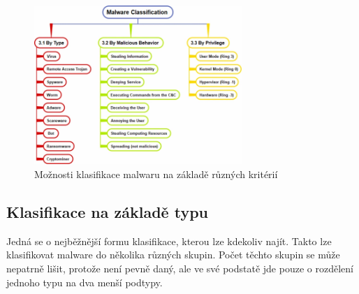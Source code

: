 \begin{figure}[h]
	\centering
        \includegraphics[width=0.7\textwidth]{obrazky/classification.png}
	\caption{Možnosti klasifikace malwaru na základě různých kritérií}
    \label{classific}
\end{figure}
\newpage
\subsection*{Klasifikace na základě typu}
Jedná se o nejběžnější formu klasifikace, kterou lze kdekoliv najít. Takto lze klasifikovat malware do několika různých skupin. Počet těchto skupin se může nepatrně lišit, protože není pevně daný, ale ve své podstatě jde 
pouze o rozdělení jednoho typu na dva menší podtypy. 

